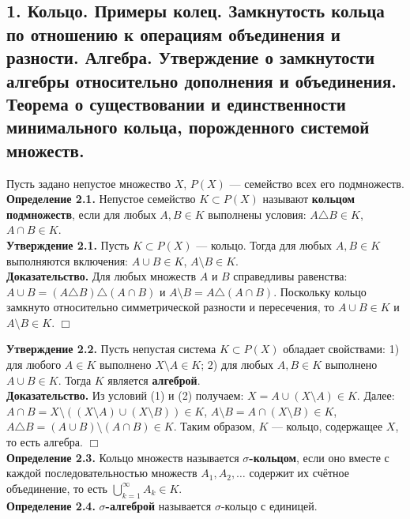 \documentclass[12pt]{article}
\begin{document}

\subsection*{1. Кольцо. Примеры колец. Замкнутость кольца по отношению к операциям
объединения и разности. Алгебра. Утверждение о замкнутости алгебры относительно
дополнения и объединения. Теорема о существовании и единственности
минимального кольца, порожденного системой множеств.} Пусть задано непустое множество $X$, $P(X)$ — семейство всех его подмножеств.\\ \textbf{Определение 2.1.} Непустое семейство $K \subset P(X)$ называют \textbf{кольцом подмножеств}, если для любых $A, B \in K$ выполнены условия: $A \triangle B \in K$, $A \cap B \in K$. \\\textbf{Утверждение 2.1.} Пусть $K \subset P(X)$ — кольцо. Тогда для любых $A, B \in K$ выполняются включения: $A \cup B \in K$, $A \setminus B \in K$. \\\textbf{Доказательство.} Для любых множеств $A$ и $B$ справедливы равенства: $A \cup B = (A \triangle B) \triangle (A \cap B)$ и $A \setminus B = A \triangle (A \cap B)$. Поскольку кольцо замкнуто относительно симметрической разности и пересечения, то $A \cup B \in K$ и $A \setminus B \in K$. \hfill $\Box$ 

 
\textbf{Утверждение 2.2.} Пусть непустая система $K \subset P(X)$ обладает свойствами: 1) для любого $A \in K$ выполнено $X \setminus A \in K$; 2) для любых $A, B \in K$ выполнено $A \cup B \in K$. Тогда $K$ является \textbf{алгеброй}. \\\textbf{Доказательство.} Из условий (1) и (2) получаем: $X = A \cup (X \setminus A) \in K$. Далее: $A \cap B = X \setminus ((X \setminus A) \cup (X \setminus B)) \in K$, $A \setminus B = A \cap (X \setminus B) \in K$, $A \triangle B = (A \cup B) \setminus (A \cap B) \in K$. Таким образом, $K$ — кольцо, содержащее $X$, то есть алгебра. \hfill $\Box$ \\\textbf{Определение 2.3.} Кольцо множеств называется \textbf{$\sigma$-кольцом}, если оно вместе с каждой последовательностью множеств $A_1, A_2, \ldots$ содержит их счётное объединение, то есть $\bigcup_{k=1}^{\infty} A_k \in K$. \\\textbf{Определение 2.4.} \textbf{$\sigma$-алгеброй} называется $\sigma$-кольцо с единицей. 
\end{document}
